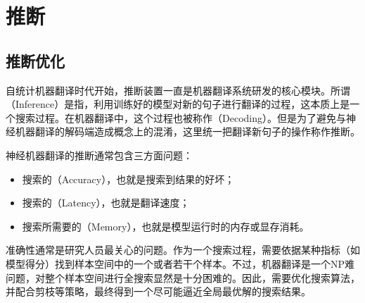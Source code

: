 
\sectionnewpage
\section{推断}


\subsection{推断优化}

\parinterval 自统计机器翻译时代开始，推断装置一直是机器翻译系统研发的核心模块。所谓{\small{}}（Inference）是指，利用训练好的模型对新的句子进行翻译的过程，这本质上是一个搜索过程。在机器翻译中，这个过程也被称作{\small{}}（Decoding）。但是为了避免与神经机器翻译的解码端造成概念上的混淆，这里统一把翻译新句子的操作称作推断。

\parinterval 神经机器翻译的推断通常包含三方面问题：

\begin{itemize}
\vspace{0.5em}
\item 搜索的{\small{}}（Accuracy），也就是搜索到结果的好坏；
\vspace{0.5em}
\item 搜索的{\small{}}（Latency），也就是翻译速度；
\vspace{0.5em}
\item 搜索所需要的{\small{}}（Memory），也就是模型运行时的内存或显存消耗。
\vspace{0.5em}
\end{itemize}

\parinterval 准确性通常是研究人员最关心的问题。作为一个搜索过程，需要依据某种指标（如模型得分）找到样本空间中的一个或者若干个样本。不过，机器翻译是一个NP难问题，对整个样本空间进行全搜索显然是十分困难的\cite{knight1999decoding}。因此，需要优化搜索算法，并配合剪枝等策略，最终得到一个尽可能逼近全局最优解的搜索结果。

